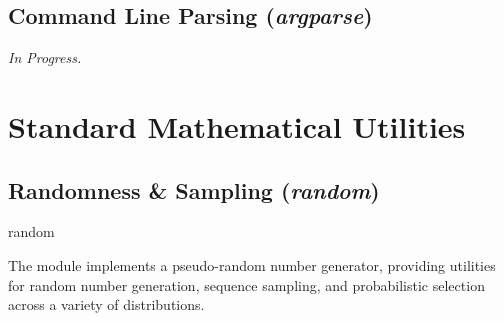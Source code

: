 \documentclass[10pt]{article}
\begin{document}
  \subsection{Command Line Parsing (\textit{argparse})}

    \textit{In Progress.}

\section{Standard Mathematical Utilities}

  \subsection{Randomness \& Sampling (\textit{random})}

    \begin{core}{random}

      The \href{https://docs.python.org/3/library/random.html}{} module implements a pseudo-random number generator, providing utilities for random number generation, sequence sampling, and probabilistic selection across a variety of distributions.

    \end{core}
\end{document}
